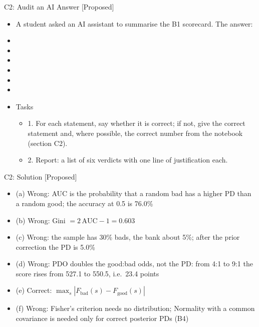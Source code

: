 \begin{frame}{C2: Audit an AI Answer [Proposed]}
\itemsize{\scriptsize}
\begin{itemize}
    \item A student asked an AI assistant to summarise the B1 scorecard. The answer:
    \item {}
    \item {}
    \item {}
    \item {}
    \item {}
    \item {}
    \item Tasks
    \begin{itemize}
        \item 1. For each statement, say whether it is correct; if not, give the correct statement and, where possible, the correct number from the notebook (section C2).
        \item 2. Report: a list of six verdicts with one line of justification each.
    \end{itemize}
\end{itemize}
\end{frame}

\ifsolutions
\begin{frame}{C2: Solution [Proposed]}
\itemsize{\footnotesize}
\begin{itemize}
    \item (a) Wrong: AUC is the probability that a random bad has a higher PD than a random good; the accuracy at 0.5 is 76.0\%
    \item (b) Wrong: Gini $= 2\,\mathrm{AUC} - 1 = 0.603$
    \item (c) Wrong: the sample has 30\% bads, the bank about 5\%; after the prior correction the PD is 5.0\%
    \item (d) Wrong: PDO doubles the good:bad odds, not the PD: from 4:1 to 9:1 the score rises from 527.1 to 550.5, i.e.\ 23.4 points
    \item (e) Correct: $\max_s|F_{\text{bad}}(s) - F_{\text{good}}(s)|$
    \item (f) Wrong: Fisher's criterion needs no distribution; Normality with a common covariance is needed only for correct posterior PDs (B4)
\end{itemize}
\end{frame}
\fi


